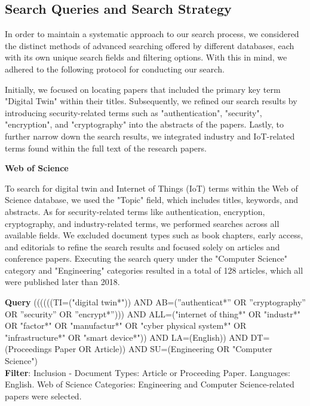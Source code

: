 \subsection{Search Queries and Search Strategy}
In order to maintain a systematic approach to our search process, we considered the distinct methods of advanced searching offered by different databases, each with its own unique search fields and filtering options. With this in mind, we adhered to the following protocol for conducting our search.
 
Initially, we focused on locating papers that included the primary key term "Digital Twin" within their titles. Subsequently, we refined our search results by introducing security-related terms such as "authentication", "security", "encryption", and "cryptography" into the abstracts of the papers. Lastly, to further narrow down the search results, we integrated industry and IoT-related terms found within the full text of the research papers. 




\textbf{Web of Science}

To search for digital twin and Internet of Things (IoT) terms within the Web of Science database, we used the "Topic" field, which includes titles, keywords, and abstracts. As for security-related terms like authentication, encryption, cryptography, and industry-related terms, we performed searches across all available fields. We excluded document types such as book chapters, early access, and editorials to refine the search results and focused solely on articles and conference papers. Executing the search query under the "Computer Science" category and "Engineering" categories resulted in a total of 128 articles, which all were published later than 2018.

\begin{tcolorbox}[colback=black!5!white, sharp corners=all, colframe=white!95!black]
\textbf{Query}
\tcblower
((((((TI=("digital twin*")) AND AB=(”authenticat*” OR ”cryptography” OR ”security” OR ”encrypt*”))) AND ALL=("internet of thing*" OR "industr*"  OR  "factor*"  OR  "manufactur*"  OR  "cyber physical system*"  OR  "infrastructure*" OR "smart device*")) AND LA=(English)) AND DT=(Proceedings Paper OR Article)) AND SU=(Engineering OR "Computer Science")  \\


\textbf{Filter}: Inclusion - Document Types: Article or Proceeding Paper. Languages: English. Web of Science Categories: Engineering and Computer Science-related papers were selected.

\end{tcolorbox}


